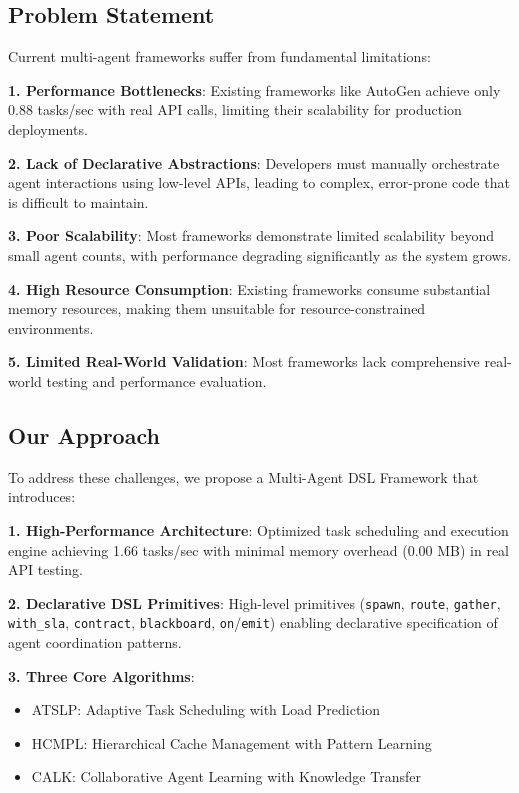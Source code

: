 \documentclass[conference]{IEEEtran}
\begin{document}
\subsection{Problem Statement}

Current multi-agent frameworks suffer from fundamental limitations:

\textbf{1. Performance Bottlenecks}: Existing frameworks like AutoGen achieve only 0.88 tasks/sec with real API calls, limiting their scalability for production deployments.

\textbf{2. Lack of Declarative Abstractions}: Developers must manually orchestrate agent interactions using low-level APIs, leading to complex, error-prone code that is difficult to maintain.

\textbf{3. Poor Scalability}: Most frameworks demonstrate limited scalability beyond small agent counts, with performance degrading significantly as the system grows.

\textbf{4. High Resource Consumption}: Existing frameworks consume substantial memory resources, making them unsuitable for resource-constrained environments.

\textbf{5. Limited Real-World Validation}: Most frameworks lack comprehensive real-world testing and performance evaluation.

\subsection{Our Approach}

To address these challenges, we propose a Multi-Agent DSL Framework that introduces:

\textbf{1. High-Performance Architecture}: Optimized task scheduling and execution engine achieving 1.66 tasks/sec with minimal memory overhead (0.00 MB) in real API testing.

\textbf{2. Declarative DSL Primitives}: High-level primitives (\texttt{spawn}, \texttt{route}, \texttt{gather}, \texttt{with\_sla}, \texttt{contract}, \texttt{blackboard}, \texttt{on}/\texttt{emit}) enabling declarative specification of agent coordination patterns.

\textbf{3. Three Core Algorithms}: 
   \begin{itemize}
   \item ATSLP: Adaptive Task Scheduling with Load Prediction
   \item HCMPL: Hierarchical Cache Management with Pattern Learning  
   \item CALK: Collaborative Agent Learning with Knowledge Transfer
   \end{itemize}
\end{document}
